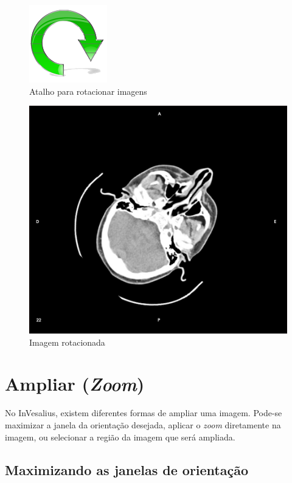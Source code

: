 \begin{figure}[!h]
\centering
\includegraphics[scale=0.25]{../user_guide_figures/icons/tool_rotate_original.png}
\caption{Atalho para rotacionar imagens}
\label{fig:rot_icon}
\end{figure}

\begin{figure}[!h]
\centering
\includegraphics[scale=0.15]{../user_guide_figures/invesalius_screen/axial_rotate.jpg}
\caption{Imagem rotacionada}
\label{fig:rotate_all}
\end{figure}

\section{Ampliar (\textit{Zoom})}

No InVesalius, existem diferentes formas de ampliar uma imagem. Pode-se maximizar a janela da
orientação desejada, aplicar o \textit{zoom} diretamente na imagem, ou selecionar a região da imagem
que será ampliada.


\subsection{Maximizando as janelas de orientação}

